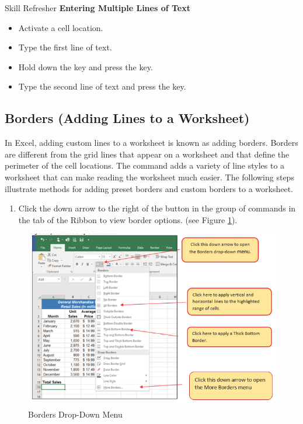 \begin{center}
	\begin{sklbox}{Skill Refresher}
		\textbf{Entering Multiple Lines of Text}
		\\
		\begin{itemize}
			\setlength{\itemsep}{0pt}
			\setlength{\parskip}{0pt}
			\setlength{\parsep}{0pt}
			
			\item Activate a cell location.
			\item Type the first line of text.
			\item Hold down the  key and press the  key.
			\item Type the second line of text and press the  key.
			
		\end{itemize}
	\end{sklbox}
\end{center}

\subsection{Borders (Adding Lines to a Worksheet)}

In Excel, adding custom lines to a worksheet is known as adding borders. Borders are different from the grid lines that appear on a worksheet and that define the perimeter of the cell locations. The  command adds a variety of line styles to a worksheet that can make reading the worksheet much easier. The following steps illustrate methods for adding preset borders and custom borders to a worksheet.

\begin{enumerate}
	\item Click the down arrow to the right of the  button in the  group of commands in the  tab of the Ribbon to view border options. (see Figure \ref{01:fig42}).
\end{enumerate}

\begin{figure}[H]
	\centering
	\includegraphics[width=\maxwidth{.95\linewidth}]{gfx/ch01_fig42}
	\caption{Borders Drop-Down Menu}
	\label{01:fig42}
\end{figure}

